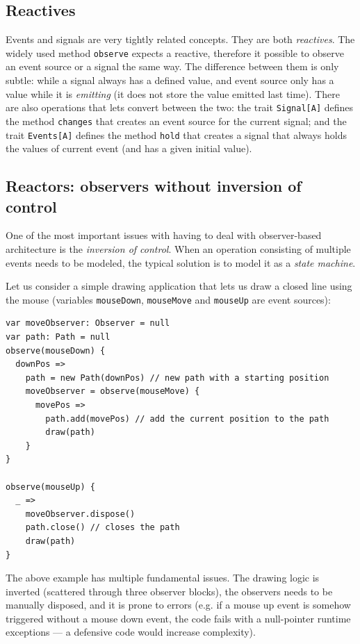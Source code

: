 \subsection{Reactives}

Events and signals are very tightly related concepts. They are both \emph{reactives}. The widely used method \texttt{observe} expects a reactive, therefore it possible to observe an event source or a signal the same way. The difference between them is only subtle: while a signal always has a defined value, and event source only has a value while it is \emph{emitting} (it does not store the value emitted last time). There are also operations that lets convert between the two: the trait \texttt{Signal[A]} defines the method \texttt{changes} that creates an event source for the current signal; and the trait \texttt{Events[A]} defines the method \texttt{hold} that creates a signal that always holds the values of current event (and has a given initial value).

\subsection{Reactors: observers without inversion of control}

One of the most important issues with having to deal with observer-based architecture is the \emph{inversion of control}. When an operation consisting of multiple events needs to be modeled, the typical solution is to model it as a \emph{state machine}. 

Let us consider a simple drawing application that lets us draw a closed line using the mouse (variables \texttt{mouseDown}, \texttt{mouseMove} and \texttt{mouseUp} are event sources):

\begin{lstlisting}
var moveObserver: Observer = null
var path: Path = null
observe(mouseDown) {
  downPos => 
    path = new Path(downPos) // new path with a starting position
    moveObserver = observe(mouseMove) {
      movePos =>
        path.add(movePos) // add the current position to the path
        draw(path)
    }
}

observe(mouseUp) {
  _ =>
    moveObserver.dispose()
    path.close() // closes the path
    draw(path)
}
\end{lstlisting}

The above example has multiple fundamental issues. The drawing logic is inverted (scattered through three observer blocks), the observers needs to be manually disposed, and it is prone to errors (e.g. if a mouse up event is somehow triggered without a mouse down event, the code fails with a null-pointer runtime exceptions --- a defensive code would increase complexity).

